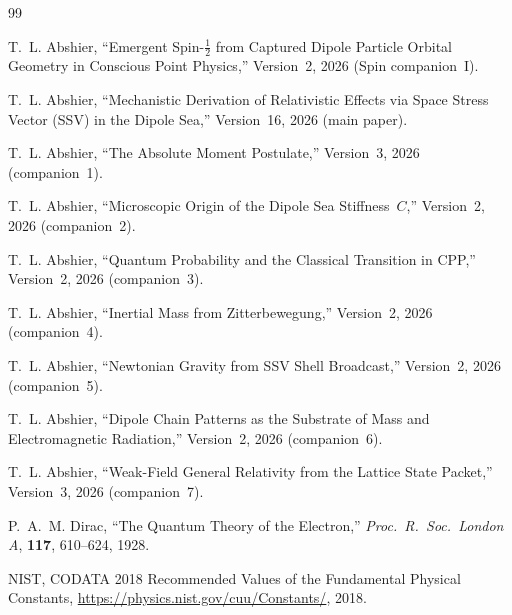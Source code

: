 \documentclass[12pt]{article}
\begin{document}
\begin{thebibliography}{99}

T.~L. Abshier,
``Emergent Spin-$\tfrac{1}{2}$ from Captured Dipole Particle Orbital
Geometry in Conscious Point Physics,''
Version~2, 2026 (Spin companion~I).

T.~L. Abshier,
``Mechanistic Derivation of Relativistic Effects via Space Stress
Vector (SSV) in the Dipole Sea,''
Version~16, 2026 (main paper).

T.~L. Abshier,
``The Absolute Moment Postulate,''
Version~3, 2026 (companion~1).

T.~L. Abshier,
``Microscopic Origin of the Dipole Sea Stiffness~$C$,''
Version~2, 2026 (companion~2).

T.~L. Abshier,
``Quantum Probability and the Classical Transition in CPP,''
Version~2, 2026 (companion~3).

T.~L. Abshier,
``Inertial Mass from Zitterbewegung,''
Version~2, 2026 (companion~4).

T.~L. Abshier,
``Newtonian Gravity from SSV Shell Broadcast,''
Version~2, 2026 (companion~5).

T.~L. Abshier,
``Dipole Chain Patterns as the Substrate of Mass and
Electromagnetic Radiation,''
Version~2, 2026 (companion~6).

T.~L. Abshier,
``Weak-Field General Relativity from the Lattice State Packet,''
Version~3, 2026 (companion~7).

P.~A.~M. Dirac,
``The Quantum Theory of the Electron,''
\textit{Proc.\ R.\ Soc.\ London A}, \textbf{117}, 610--624, 1928.

NIST, CODATA 2018 Recommended Values of the Fundamental Physical
Constants,
\url{https://physics.nist.gov/cuu/Constants/}, 2018.

\end{thebibliography}
\end{document}
